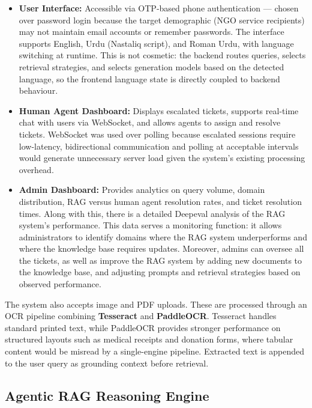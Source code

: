 \begin{itemize}
    \item \textbf{User Interface:} Accessible via OTP-based phone authentication 
    — chosen over password login because the target demographic (NGO service 
    recipients) may not maintain email accounts or remember passwords. The 
    interface supports English, Urdu (Nastaliq script), and Roman Urdu, with 
    language switching at runtime. This is not cosmetic: the backend routes 
    queries, selects retrieval strategies, and selects generation models based on 
    the detected language, so the frontend language state is directly coupled to 
    backend behaviour.

    \item \textbf{Human Agent Dashboard:} Displays escalated tickets, supports 
    real-time chat with users via WebSocket, and allows agents to assign and 
    resolve tickets. WebSocket was used over polling because escalated sessions 
    require low-latency, bidirectional communication and polling at acceptable 
    intervals would generate unnecessary server load given the system's existing 
    processing overhead.

    \item \textbf{Admin Dashboard:} Provides analytics on query volume, domain 
    distribution, RAG versus human agent resolution rates, and ticket resolution 
    times. Along with this, there is a detailed Deepeval analysis of the RAG system's performance. 
    This data serves a monitoring function: it allows administrators to 
    identify domains where the RAG system underperforms and where the knowledge 
    base requires updates. Moreover, admins can oversee all the tickets, as well as 
    improve the RAG system by adding new documents to the knowledge base, and adjusting prompts and 
    retrieval strategies based on observed performance.
\end{itemize}

The system also accepts image and PDF uploads. These are processed through an 
OCR pipeline combining \textbf{Tesseract} and \textbf{PaddleOCR}. Tesseract 
handles standard printed text, while PaddleOCR provides stronger performance on 
structured layouts such as medical receipts and donation forms, where tabular 
content would be misread by a single-engine pipeline. Extracted text is appended 
to the user query as grounding context before retrieval.

\subsection{Agentic RAG Reasoning Engine}

